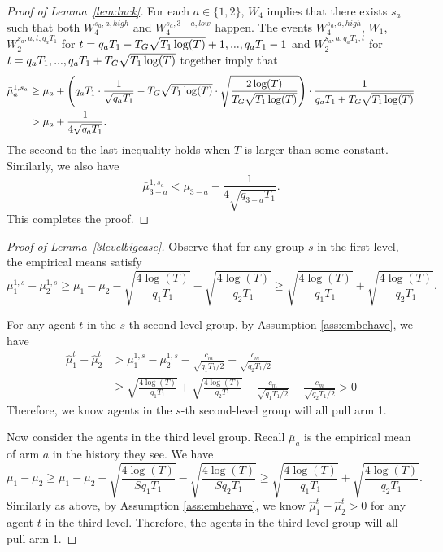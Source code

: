 \begin{proof}[Proof of Lemma~\ref{lem:luck}]
  For each $a \in \{1,2\}$, $W_4$ implies that there exists $s_a$ such
  that both $W_4^{s_a,a,high}$ and $W_4^{s_a,3-a,low}$ happen.  The
  events $W_4^{s_a,a,high}$, $W_1$, $W_2^{s_a,a,t, q_aT_1}$
  for $t = q_a T_1- T_G \sqrt{T_1\log(T)}+1, ...,q_aT_1-1$ and
  $W_2^{s_a,a,q_aT_1,t}$ for
  $t= q_aT_1,...,q_a T_1+ T_G \sqrt{T_1\log(T)}$ together imply that
\begin{align*}
\bar{\mu}_a ^{1,s_a} &\geq \mu_a + \left(q_aT_1 \cdot \frac{1}{\sqrt{q_aT_1}} - T_G \sqrt{T_1\log(T)} \cdot \sqrt{\frac{2\log(T)}{ T_G \sqrt{T_1\log(T)}}} \right) \cdot \frac{1}{q_a T_1+ T_G \sqrt{T_1\log(T)}} \\
&> \mu_a + \frac{1}{4\sqrt{q_aT_1}}.
\end{align*}
The second to the last inequality holds when $T$ is larger than some constant.
Similarly, we also have
\[
\bar{\mu}_{3-a} ^{1,s_a} < \mu_{3-a}   - \frac{1}{4\sqrt{q_{3-a} T_1}}.
\]
This completes the proof.
\end{proof}



\begin{proof}[Proof of Lemma~\ref{3levelbigcase}]
  Observe that for any group $s$ in the first level, the empirical
  means satisfy
\[
\bar{\mu}_1^{1,s} - \bar{\mu}_2^{1,s} \geq \mu_1 -\mu_2 - \sqrt{\frac{4\log(T)}{q_1T_1}} - \sqrt{\frac{4\log(T)}{q_2T_1}} \geq  \sqrt{\frac{4\log(T)}{q_1T_1}} + \sqrt{\frac{4\log(T)}{q_2T_1}}.
\]


For any agent $t$ in the $s$-th second-level group, by Assumption \ref{ass:embehave}, we have
\begin{align*}
\hat{\mu}_1^t - \hat{\mu}_2^t &>\bar{\mu}_1^{1,s} - \bar{\mu}_2^{1,s} - \frac{c_m}{\sqrt{q_1T_1/2}} - \frac{c_m}{\sqrt{q_2T_1/2}}\\
&\geq  \sqrt{\frac{4\log(T)}{q_1T_1}} + \sqrt{\frac{4\log(T)}{q_2T_1}}- \frac{c_m}{\sqrt{q_1T_1/2}} - \frac{c_m}{\sqrt{q_2T_1/2}} > 0
\end{align*}
Therefore, we know agents in the $s$-th second-level group will all pull arm 1.

Now consider the agents in the third level group. Recall $\bar{\mu}_a$
is the empirical mean of arm $a$ in the history they see. We have
\[
\bar{\mu}_1 - \bar{\mu}_2 \geq \mu_1 -\mu_2 - \sqrt{\frac{4\log(T)}{Sq_1T_1}} - \sqrt{\frac{4\log(T)}{Sq_2T_1}} \geq  \sqrt{\frac{4\log(T)}{q_1T_1}} 
+ \sqrt{\frac{4\log(T)}{q_2T_1}}.
\]
Similarly as above, by Assumption \ref{ass:embehave}, we know
$\hat{\mu}_1^t - \hat{\mu}_2^t > 0$ for any agent $t$ in the third
level. Therefore, the agents in the third-level group will all pull
arm 1.  
\end{proof}



